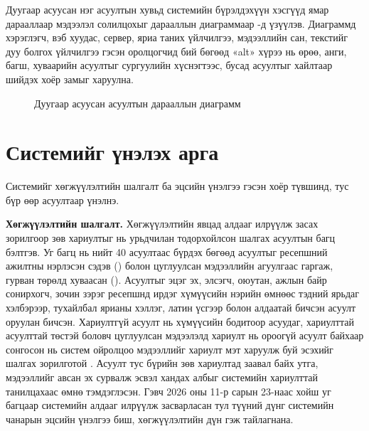 Дуугаар асуусан нэг асуултын хувьд системийн бүрэлдэхүүн хэсгүүд ямар дарааллаар мэдээлэл солилцохыг дарааллын диаграммаар -д үзүүлэв. Диаграммд хэрэглэгч, вэб хуудас, сервер, яриа таних үйлчилгээ, мэдээллийн сан, текстийг дуу болгох үйлчилгээ гэсэн оролцогчид бий бөгөөд «alt» хүрээ нь өрөө, анги, багш, хуваарийн асуултыг сургуулийн хүснэгтээс, бусад асуултыг хайлтаар шийдэх хоёр замыг харуулна.

\begin{figure}[tbp]
\centering
{}
\caption{Дуугаар асуусан асуултын дарааллын диаграмм}
\label{fig:sequence}
\end{figure}

\section{Системийг үнэлэх арга}
\label{sec:evaluation-method}

Системийг хөгжүүлэлтийн шалгалт ба эцсийн үнэлгээ гэсэн хоёр түвшинд, тус бүр өөр асуултаар үнэлнэ.

\textbf{Хөгжүүлэлтийн шалгалт.} Хөгжүүлэлтийн явцад алдааг илрүүлж засах зорилгоор зөв хариултыг нь урьдчилан тодорхойлсон шалгах асуултын багц бэлтгэв. Уг багц нь нийт 40 асуултаас бүрдэх бөгөөд асуултыг ресепшний ажилтны нэрлэсэн сэдэв () болон цуглуулсан мэдээллийн агуулгаас гаргаж, гурван төрөлд хуваасан (). Асуултыг эцэг эх, элсэгч, оюутан, ажлын байр сонирхогч, зочин зэрэг ресепшнд ирдэг хүмүүсийн нэрийн өмнөөс тэдний ярьдаг хэлбэрээр, тухайлбал ярианы хэллэг, латин үсгээр болон алдаатай бичсэн асуулт оруулан бичсэн. Хариултгүй асуулт нь хүмүүсийн бодитоор асуудаг, хариулттай асуулттай төстэй боловч цуглуулсан мэдээлэлд хариулт нь ороогүй асуулт байхаар сонгосон нь систем ойролцоо мэдээллийг хариулт мэт харуулж буй эсэхийг шалгах зорилготой \cite{rajpurkar2018squad2}. Асуулт тус бүрийн зөв хариултад заавал байх утга, мэдээллийг авсан эх сурвалж эсвэл хандах албыг системийн хариулттай танилцахаас өмнө тэмдэглэсэн. Гэвч 2026 оны 11-р сарын 23-наас хойш уг багцаар системийн алдааг илрүүлж засварласан тул түүний дүнг системийн чанарын эцсийн үнэлгээ биш, хөгжүүлэлтийн дүн гэж тайлагнана.

